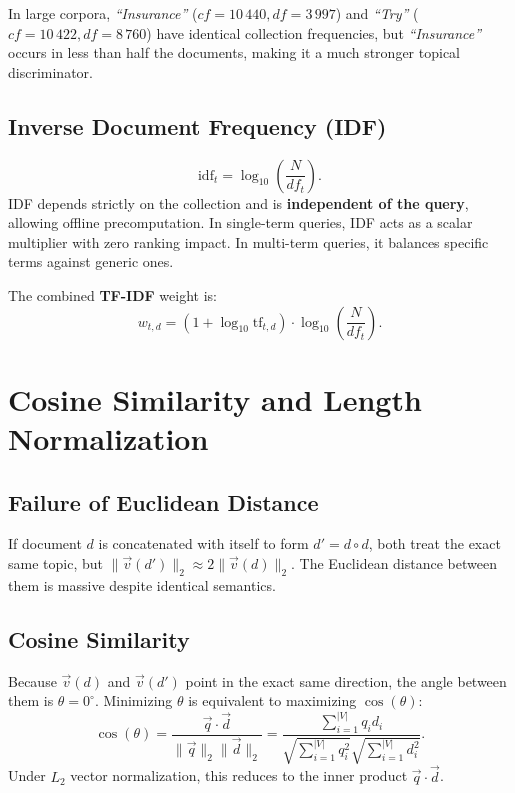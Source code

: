 In large corpora, \textit{``Insurance''} ($cf = 10\,440, df = 3\,997$) and \textit{``Try''} ($cf = 10\,422, df = 8\,760$) have identical collection frequencies, but \textit{``Insurance''} occurs in less than half the documents, making it a much stronger topical discriminator.

\subsection{Inverse Document Frequency (IDF)}
\begin{equation}
\text{idf}_t = \log_{10}\left(\frac{N}{df_t}\right).
\end{equation}
IDF depends strictly on the collection and is \textbf{independent of the query}, allowing offline precomputation. In single-term queries, IDF acts as a scalar multiplier with zero ranking impact. In multi-term queries, it balances specific terms against generic ones.

The combined \textbf{TF-IDF} weight is:
\begin{equation}
w_{t,d} = (1 + \log_{10}\text{tf}_{t,d}) \cdot \log_{10}\left(\frac{N}{df_t}\right).
\end{equation}

\FloatBarrier
\section{Cosine Similarity and Length Normalization}
\label{sec:cosine-similarity-en}

\subsection{Failure of Euclidean Distance}
If document $d$ is concatenated with itself to form $d' = d \circ d$, both treat the exact same topic, but $\|\vec{v}(d')\|_2 \approx 2\|\vec{v}(d)\|_2$. The Euclidean distance between them is massive despite identical semantics.

\subsection{Cosine Similarity}
Because $\vec{v}(d)$ and $\vec{v}(d')$ point in the exact same direction, the angle between them is $\theta = 0^\circ$. Minimizing $\theta$ is equivalent to maximizing $\cos(\theta)$:
\begin{equation}
\cos(\theta) = \frac{\vec{q} \cdot \vec{d}}{\|\vec{q}\|_2 \|\vec{d}\|_2} = \frac{\sum_{i=1}^{|V|} q_i d_i}{\sqrt{\sum_{i=1}^{|V|} q_i^2} \sqrt{\sum_{i=1}^{|V|} d_i^2}}.
\end{equation}
Under $L_2$ vector normalization, this reduces to the inner product $\vec{q} \cdot \vec{d}$.


